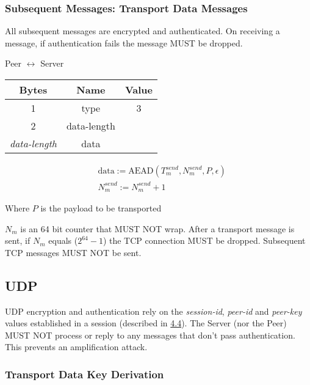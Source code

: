 \subsubsection{Subsequent Messages: Transport Data Messages}

All subsequent messages are encrypted and authenticated. On receiving a message, if authentication fails the message
MUST be dropped.

\begin{center}
    Peer $\leftrightarrow$ Server\\
    \begin{tabular}{|c|c|c|}
        \hline
        \textbf{Bytes}     & \textbf{Name} & \textbf{Value} \\
        \hline
        1                  & type          & 3              \\
        \hline
        2                  & data-length   &                \\
        \hline
        \emph{data-length} & data          &                \\
        \hline
    \end{tabular}
\end{center}

\begin{align*}
    & \text{data} := \text{AEAD}(T_{m}^{send}, N_{m}^{send}, P, \epsilon) \\
    & N_{m}^{send} := N_{m}^{send} + 1
\end{align*}

Where $P$ is the payload to be transported

$N_{m}$ is an 64 bit counter that MUST NOT wrap. After a transport message is sent, if $N_{m}$ equals
($2^{64}-1$) the TCP connection MUST be dropped. Subsequent TCP messages MUST NOT be sent. \\

\subsection{UDP}

UDP encryption and authentication rely on the \emph{session-id}, \emph{peer-id} and \emph{peer-key} values
established in a session
(described in \hyperlink{subsection.4.4}{4.4}). The Server (nor the Peer) MUST NOT
process or reply to any messages that don't pass authentication. This prevents an amplification attack.\\

\subsubsection{Transport Data Key Derivation}

